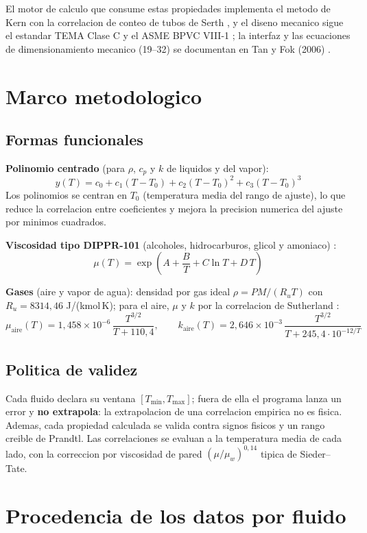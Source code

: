 \documentclass[11pt,a4paper]{article}
\begin{document}
El motor de calculo que consume estas propiedades implementa el metodo de
Kern \cite{kern} con la correlacion de conteo de tubos de Serth
\cite{serth}, y el diseno mecanico sigue el estandar TEMA Clase C
\cite{tema} y el ASME BPVC VIII-1 \cite{asme}; la interfaz y las ecuaciones
de dimensionamiento mecanico (19--32) se documentan en Tan y Fok (2006)
\cite{tan-fok}.

\section{Marco metodologico}
\subsection{Formas funcionales}
\textbf{Polinomio centrado} (para $\rho$, $c_p$ y $k$ de liquidos y del
vapor):
\[
  y(T) = c_0 + c_1 (T - T_0) + c_2 (T - T_0)^2 + c_3 (T - T_0)^3
\]
Los polinomios se centran en $T_0$ (temperatura media del rango de ajuste),
lo que reduce la correlacion entre coeficientes y mejora la precision
numerica del ajuste por minimos cuadrados.

\textbf{Viscosidad tipo DIPPR-101} (alcoholes, hidrocarburos, glicol y
amoniaco) \cite{dippr, perry}:
\[
  \mu(T) = \exp\!\left(A + \frac{B}{T} + C \ln T + D\,T\right)
\]

\textbf{Gases} (aire y vapor de agua): densidad por gas ideal
$\rho = P M / (R_u T)$ con $R_u = 8314{,}46$ J/(kmol\,K); para el aire,
$\mu$ y $k$ por la correlacion de Sutherland \cite{sutherland}:
\[
  \mu_{\mathrm{aire}}(T) = 1{,}458\times10^{-6}\,
  \frac{T^{3/2}}{T + 110{,}4}, \qquad
  k_{\mathrm{aire}}(T) = 2{,}646\times10^{-3}\,
  \frac{T^{3/2}}{T + 245{,}4\cdot 10^{-12/T}}
\]

\subsection{Politica de validez}
Cada fluido declara su ventana $[T_{\min}, T_{\max}]$; fuera de ella el
programa lanza un error y \textbf{no extrapola}: la extrapolacion de una
correlacion empirica no es fisica. Ademas, cada propiedad calculada se
valida contra signos fisicos y un rango creible de Prandtl. Las
correlaciones se evaluan a la temperatura media de cada lado, con la
correccion por viscosidad de pared $(\mu/\mu_w)^{0{,}14}$ tipica de
Sieder--Tate.

\section{Procedencia de los datos por fluido}
\end{document}
